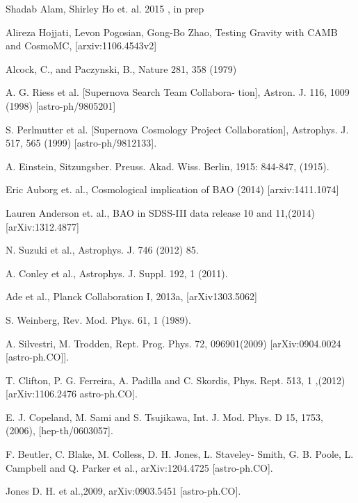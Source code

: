 \begin{thebibliography}{99}

Shadab Alam, Shirley Ho  et. al. 2015 , in prep


 Alireza Hojjati,
 Levon Pogosian, Gong-Bo Zhao, Testing Gravity with CAMB and CosmoMC, [arxiv:1106.4543v2]

   Alcock, C., and Paczynski, B., Nature 281, 358 (1979)
   
 A. G. Riess et al. [Supernova Search Team Collabora- tion], Astron. J. 116, 1009 (1998) [astro-ph/9805201]
 
 S. Perlmutter et al. [Supernova Cosmology Project Collaboration], Astrophys. J. 517, 565 (1999) [astro-ph/9812133].

 A. Einstein, Sitzungsber. Preuss. Akad. Wiss. Berlin, 1915: 844-847, (1915).


 Eric Auborg et. al., Cosmological implication of BAO (2014) [arxiv:1411.1074]

 Lauren Anderson et. al., BAO in SDSS-III data release 10 and 11,(2014) [arXiv:1312.4877]

 N. Suzuki et al., Astrophys. J. 746 (2012) 85.

 A. Conley et al., Astrophys. J. Suppl. 192, 1 (2011).

 Ade et al., Planck Collaboration I, 2013a, [arXiv1303.5062]

 S. Weinberg, Rev. Mod. Phys. 61, 1 (1989).

 A. Silvestri, M. Trodden, Rept. Prog. Phys. 72, 096901(2009) [arXiv:0904.0024 [astro-ph.CO]].

 T. Clifton, P. G. Ferreira, A. Padilla and C. Skordis, Phys. Rept. 513, 1 ,(2012) [arXiv:1106.2476 astro-ph.CO].

 E. J. Copeland, M. Sami and S. Tsujikawa, Int. J. Mod. Phys. D 15, 1753, (2006), [hep-th/0603057].
 
F. Beutler, C. Blake, M. Colless, D. H. Jones, L. Staveley- Smith, G. B. Poole, L. Campbell and Q. Parker et al., arXiv:1204.4725 [astro-ph.CO].

Jones D. H. et al.,2009, arXiv:0903.5451 [astro-ph.CO].


\end{thebibliography}
